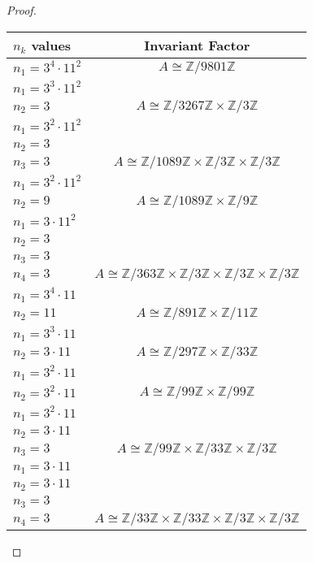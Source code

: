 \documentclass[10pt]{article}
\newcommand{\Z}{\mathbb{Z}}
\begin{document}
\begin{itemize}
\begin{proof}
\begin{item}
\begin{center}
  \begin{tabular}{ l  c }
    $n_k$ values & Invariant Factor \\ \hline
    $n_1=3^4 \cdot 11^2$ & $A\cong \Z / 9801\Z$ \\ \hline
	\hline    
	$n_1=3^3 \cdot 11^2$ &  \\ \hline
	$n_2=3$ & $A\cong \Z / 3267\Z \times \Z / 3\Z$ \\ \hline
    \hline
	$n_1=3^2 \cdot 11^2$ & \\ \hline
	$n_2=3$ & \\ \hline
	$n_3=3$ & $A\cong \Z / 1089\Z \times \Z / 3\Z \times \Z / 3\Z$ \\ \hline
	\hline
	$n_1=3^2 \cdot 11^2$ & \\ \hline
	$n_2=9$ & $A\cong \Z / 1089\Z \times \Z / 9\Z$ \\ \hline
	\hline
	$n_1=3 \cdot 11^2$ & \\ \hline
	$n_2=3$ & \\ \hline
	$n_3=3$ & \\ \hline
	$n_4=3$ & $A\cong \Z / 363\Z \times \Z / 3\Z \times \Z / 3\Z \times \Z / 3\Z$ \\ \hline
	\hline
	$n_1=3^4 \cdot 11$ &  \\ \hline
	$n_2=11$ & $A\cong \Z / 891\Z \times \Z / 11\Z$ \\ \hline
    \hline
	$n_1=3^3 \cdot 11$ &  \\ \hline
	$n_2=3 \cdot 11$ & $A\cong \Z / 297\Z \times \Z / 33\Z$ \\ \hline
	\hline
	$n_1=3^2 \cdot 11$ & \\ \hline
	$n_2=3^2 \cdot 11$ & $A\cong \Z / 99\Z \times \Z / 99\Z$ \\ \hline
	\hline
	$n_1=3^2 \cdot 11$ & \\ \hline
	$n_2=3 \cdot 11$ &  \\ \hline
	$n_3=3$ & $A\cong \Z / 99\Z \times \Z / 33\Z \times \Z / 3\Z$ \\ \hline
	\hline
	$n_1=3 \cdot 11$ & \\ \hline
	$n_2=3 \cdot 11$ & \\ \hline
	$n_3=3$ & \\ \hline
	$n_4=3$ & $A\cong \Z / 33\Z \times \Z / 33\Z \times \Z / 3\Z \times \Z / 3\Z$ \\ \hline
	\hline
  \end{tabular}
\end{center} 

\end{item}


\end{proof}
\end{itemize}
\end{document}
